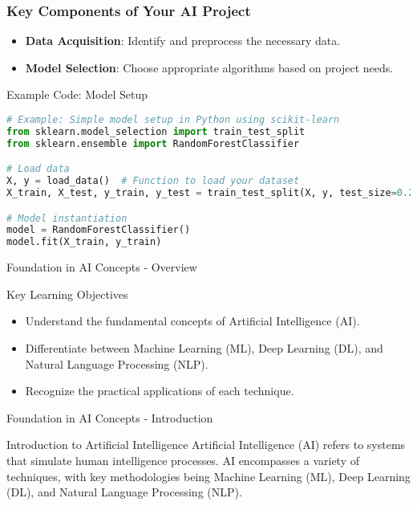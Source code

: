 \documentclass[aspectratio=169]{beamer}
\begin{document}
\begin{frame}[fragile]
    \frametitle{Key Components of Your AI Project}
    \begin{itemize}
        \item \textbf{Data Acquisition}: Identify and preprocess the necessary data.
        \item \textbf{Model Selection}: Choose appropriate algorithms based on project needs.
    \end{itemize}
    
    \begin{block}{Example Code: Model Setup}
        \begin{lstlisting}[language=Python]
# Example: Simple model setup in Python using scikit-learn
from sklearn.model_selection import train_test_split
from sklearn.ensemble import RandomForestClassifier

# Load data
X, y = load_data()  # Function to load your dataset
X_train, X_test, y_train, y_test = train_test_split(X, y, test_size=0.2)

# Model instantiation
model = RandomForestClassifier()
model.fit(X_train, y_train)
        \end{lstlisting}
    \end{block}
\end{frame}

\begin{frame}[fragile]{Foundation in AI Concepts - Overview}
    \begin{block}{Key Learning Objectives}
        \begin{itemize}
            \item Understand the fundamental concepts of Artificial Intelligence (AI).
            \item Differentiate between Machine Learning (ML), Deep Learning (DL), and Natural Language Processing (NLP).
            \item Recognize the practical applications of each technique.
        \end{itemize}
    \end{block}
\end{frame}

\begin{frame}[fragile]{Foundation in AI Concepts - Introduction}
    \begin{block}{Introduction to Artificial Intelligence}
        Artificial Intelligence (AI) refers to systems that simulate human intelligence processes. AI encompasses a variety of techniques, with key methodologies being Machine Learning (ML), Deep Learning (DL), and Natural Language Processing (NLP).
    \end{block}
\end{frame}
\end{document}
